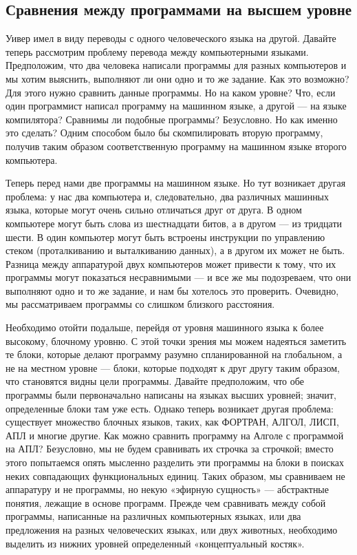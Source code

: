 \documentclass[../main.tex]{subfiles}
\begin{document}
\subsection{Сравнения между программами на высшем уровне}

Уивер имел в виду переводы с одного человеческого языка на другой. Давайте теперь рассмотрим проблему перевода между компьютерными языками. Предположим, что два человека написали программы для разных компьютеров и мы хотим выяснить, выполняют ли они одно и то же задание. Как это возможно? Для этого нужно сравнить данные программы. Но на каком уровне? Что, если один программист написал программу на машинном языке, а другой --- на языке компилятора? Сравнимы ли подобные программы? Безусловно. Но как именно это сделать? Одним способом было бы скомпилировать вторую программу, получив таким образом соответственную программу на машинном языке второго компьютера.

Теперь перед нами две программы на машинном языке. Но тут возникает другая проблема: у нас два компьютера и, следовательно, два различных машинных языка, которые могут очень сильно отличаться друг от друга. В одном компьютере могут быть слова из шестнадцати битов, а в другом --- из тридцати шести. В один компьютер могут быть встроены инструкции по управлению стеком (проталкиванию и выталкиванию данных), а в другом их может не быть. Разница между аппаратурой двух компьютеров может привести к тому, что их программы могут показаться несравнимыми --- и все же мы подозреваем, что они выполняют одно и то же задание, и нам бы хотелось это проверить. Очевидно, мы рассматриваем программы со слишком близкого расстояния.

Необходимо отойти подальше, перейдя от уровня машинного языка к более высокому, блочному уровню. С этой точки зрения мы можем надеяться заметить те блоки, которые делают программу разумно спланированной на глобальном, а не на местном уровне --- блоки, которые подходят к друг другу таким образом, что становятся видны цели программы. Давайте предположим, что обе программы были первоначально написаны на языках высших уровней; значит, определенные блоки там уже есть. Однако теперь возникает другая проблема: существует множество блочных языков, таких, как ФОРТРАН, АЛГОЛ, ЛИСП, АПЛ и многие другие. Как можно сравнить программу на Алголе с программой на АПЛ? Безусловно, мы не будем сравнивать их строчка за строчкой; вместо этого попытаемся опять мысленно разделить эти программы на блоки в поисках неких совпадающих функциональных единиц. Таких образом, мы сравниваем не аппаратуру и не программы, но некую «эфирную сущность» --- абстрактные понятия, лежащие в основе программ. Прежде чем сравнивать между собой программы, написанные на различных компьютерных языках, или два предложения на разных человеческих языках, или двух животных, необходимо выделить из нижних уровней определенный «концептуальный костяк».
\end{document}
